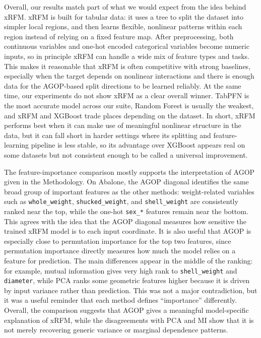 Overall, our results match part of what we would expect from the idea behind xRFM. xRFM is built for tabular data: it uses a tree to split the dataset into simpler local regions, and then learns flexible, nonlinear patterns within each region instead of relying on a fixed feature map. After preprocessing, both continuous variables and one-hot encoded categorical variables become numeric inputs, so in principle xRFM can handle a wide mix of feature types and tasks. This makes it reasonable that xRFM is often competitive with strong baselines, especially when the target depends on nonlinear interactions and there is enough data for the AGOP-based split directions to be learned reliably. At the same time, our experiments do not show xRFM as a clear overall winner. TabPFN is the most accurate model across our suite, Random Forest is usually the weakest, and xRFM and XGBoost trade places depending on the dataset. In short, xRFM performs best when it can make use of meaningful nonlinear structure in the data, but it can fall short in harder settings where its splitting and feature-learning pipeline is less stable, so its advantage over XGBoost appears real on some datasets but not consistent enough to be called a universal improvement.

The feature-importance comparison mostly supports the interpretation of AGOP given in the Methodology. On Abalone, the AGOP diagonal identifies the same broad group of important features as the other methods: weight-related variables such as \texttt{whole\_weight}, \texttt{shucked\_weight}, and \texttt{shell\_weight} are consistently ranked near the top, while the one-hot \texttt{sex\_*} features remain near the bottom. This agrees with the idea that the AGOP diagonal measures how sensitive the trained xRFM model is to each input coordinate. It is also useful that AGOP is especially close to permutation importance for the top two features, since permutation importance directly measures how much the model relies on a feature for prediction. The main differences appear in the middle of the ranking: for example, mutual information gives very high rank to \texttt{shell\_weight} and \texttt{diameter}, while PCA ranks some geometric features higher because it is driven by input variance rather than prediction. This was not a major contradiction, but it was a useful reminder that each method defines ``importance'' differently. Overall, the comparison suggests that AGOP gives a meaningful model-specific explanation of xRFM, while the disagreements with PCA and MI show that it is not merely recovering generic variance or marginal dependence patterns.

